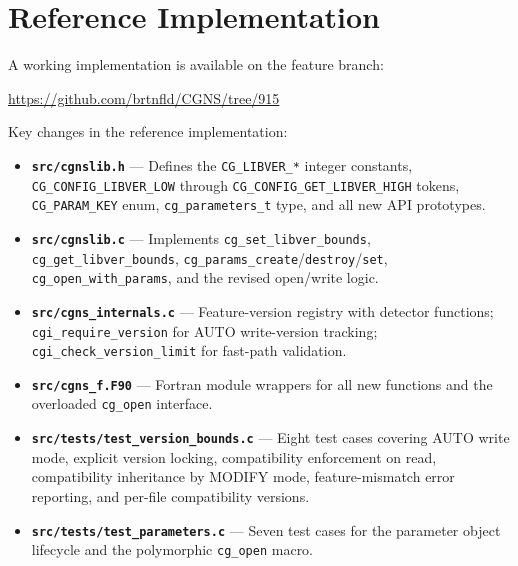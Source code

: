 \documentclass[11pt,letterpaper]{article}
\begin{document}
\section{Reference Implementation}

A working implementation is available on the feature branch:

\begin{center}
\url{https://github.com/brtnfld/CGNS/tree/915}
\end{center}

Key changes in the reference implementation:

\begin{itemize}[leftmargin=2em]
\item \textbf{\texttt{src/cgnslib.h}} --- Defines the
  \texttt{CG\_LIBVER\_*} integer constants,
  \texttt{CG\_CONFIG\_LIBVER\_LOW} through
  \texttt{CG\_CONFIG\_GET\_LIBVER\_HIGH} tokens,
  \texttt{CG\_PARAM\_KEY} enum, \texttt{cg\_parameters\_t} type,
  and all new API prototypes.
\item \textbf{\texttt{src/cgnslib.c}} --- Implements
  \texttt{cg\_set\_libver\_bounds},
  \texttt{cg\_get\_libver\_bounds},
  \texttt{cg\_params\_create}/\texttt{destroy}/\texttt{set},
  \texttt{cg\_open\_with\_params}, and the revised open/write logic.
\item \textbf{\texttt{src/cgns\_internals.c}} --- Feature-version
  registry with detector functions; \texttt{cgi\_require\_version}
  for AUTO write-version tracking;
  \texttt{cgi\_check\_version\_limit} for fast-path validation.
\item \textbf{\texttt{src/cgns\_f.F90}} --- Fortran module wrappers
  for all new functions and the overloaded \texttt{cg\_open}
  interface.
\item \textbf{\texttt{src/tests/test\_version\_bounds.c}} ---
  Eight test cases covering AUTO write mode, explicit version
  locking, compatibility enforcement on read, compatibility
  inheritance by MODIFY mode, feature-mismatch error reporting,
  and per-file compatibility versions.
\item \textbf{\texttt{src/tests/test\_parameters.c}} ---
  Seven test cases for the parameter object lifecycle and the
  polymorphic \texttt{cg\_open} macro.
\end{itemize}

\end{document}
